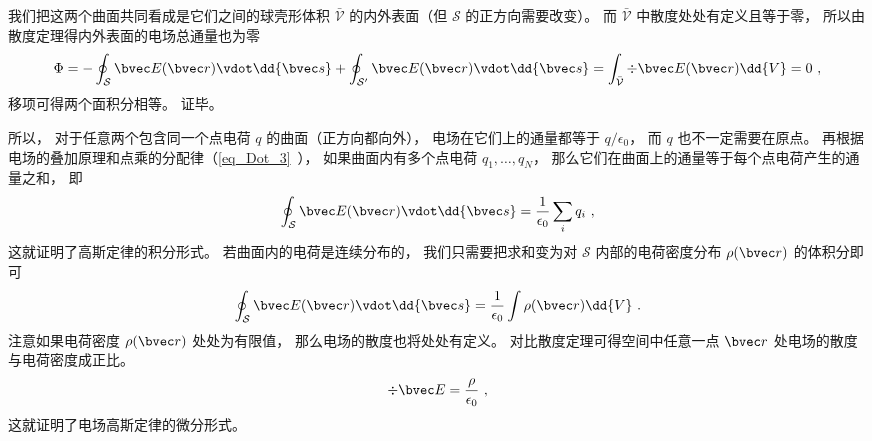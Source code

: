 我们把这两个曲面共同看成是它们之间的球壳形体积 $\bar{\mathcal V}$ 的内外表面（但 $\mathcal S$ 的正方向需要改变）。 而 $\bar{\mathcal V}$ 中散度处处有定义且等于零， 所以由散度定理得内外表面的电场总通量也为零
\begin{equation}
\Phi = -\oint_{\mathcal S} \bvec E(\bvec r) \vdot \dd{\bvec s} + \oint_{\mathcal S'} \bvec E(\bvec r)\vdot \dd{\bvec s} = \int_{\bar{\mathcal V}} \div \bvec E(\bvec r) \dd{V} = 0~,
\end{equation}
移项可得两个面积分相等。 证毕。

所以， 对于任意两个包含同一个点电荷 $q$ 的曲面（正方向都向外）， 电场在它们上的通量都等于 $q/\epsilon_0$， 而 $q$ 也不一定需要在原点。 再根据电场的叠加原理和点乘的分配律（\autoref{eq_Dot_3}~）， 如果曲面内有多个点电荷 $q_1, \dots, q_N$， 那么它们在曲面上的通量等于每个点电荷产生的通量之和， 即
\begin{equation}
\oint_{\mathcal S} \bvec E(\bvec r) \vdot \dd{\bvec s} = \frac{1}{\epsilon_0} \sum_i q_i~,
\end{equation}
这就证明了高斯定律的积分形式。 若曲面内的电荷是连续分布的， 我们只需要把求和变为对 $\mathcal S$ 内部的电荷密度分布 $\rho(\bvec r)$ 的体积分即可
\begin{equation}
\oint_{\mathcal S} \bvec E(\bvec r) \vdot \dd{\bvec s} = \frac{1}{\epsilon_0} \int \rho(\bvec r) \dd{V}~.
\end{equation}
注意如果电荷密度 $\rho(\bvec r)$ 处处为有限值， 那么电场的散度也将处处有定义。 对比散度定理可得空间中任意一点 $\bvec r$ 处电场的散度与电荷密度成正比。
\begin{equation}
\div \bvec E = \frac{\rho}{\epsilon_0}~,
\end{equation}
这就证明了电场高斯定律的微分形式。
